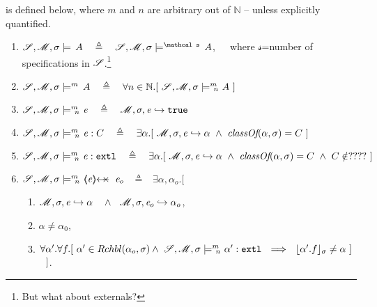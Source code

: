 \begin{definition} 
\label{def:chainmail-semantics}
\label{def:chainmail-protection-from}
\label{sect:semantics:assert:prtFrom}
 \label{def:chainmail-protection}
is defined below, where $m$ and $n$ are arbitrary out of $\mathbb N$ -- unless explicitly quantified.

\begin{enumerate}
\item
\label{sat}
$\sat \sigma  A \ \ \ \triangleq \ \ \   \satM  \sigma {\mathcal s}  A $,\ \ \  where ${\mathcal s}$=number of specifications in ${\mathcal{S}}$.\footnote{But what about externals?}
\item
\label{satM}
${{\mathcal{S}}, {\mathcal M}, \sigma \models^{m} \, A} \ \ \ \triangleq \ \ \  \forall n\in \mathbb{N}. [\ {\mathcal{S}}, {\mathcal M}, \sigma \models^{m} \!\!\!\!_{n} \ {A}\ ]$
\item
\label{cExpr}
$\satMN \sigma m n {{\re}}\ \ \ \triangleq \ \ \   \eval{\Mod}{\sigma}{{\re}}{\true}$  
\item
\label{cClass}
$\satMN \sigma m n {\re : C}\ \ \ \triangleq \ \ \   \exists \alpha.[\ \eval{\Mod}{\sigma}{{\re}}{\alpha}\   \wedge \ \class{\alpha} {\sigma}= C\ ]$  
\item
\label{cExternal}
$\satMN \sigma m n {\external \re}\ \ \ \triangleq \ \ \  \exists \alpha.[\ \eval{\Mod}{\sigma} {\re} {\alpha}\   \wedge \ \class{\alpha} {\sigma}= C  \ \wedge \ C \notin ???? \ ]$ 
 \item
 \label{cProtected}
$\satMN \sigma m n {\protectedFrom \re  {\re_o}}$ $\ \  \triangleq\ \ $ 
$\exists \alpha, \alpha_{o}. [$ 
  \begin{enumerate}
 \item
 $ \eval{\Mod}{\sigma}{{\re}}{\alpha}\ \ \ \wedge\ \ \eval{\Mod}{\sigma}{{\re_o}}{\alpha_o}$,
  \item
$\alpha\neq \alpha_0$,
 \item
$\forall \alpha'.\forall f.[\ \alpha' \in {\ensuremath{Rchbl(\alpha_o,\sigma)}} \wedge\   {\mathcal{S}}, {\mathcal M}, \sigma \models^{m} \!\!\!\!_{n} \ {\alpha':\mbox{\normalfont{\texttt{extl}}}} 
\ \ \Longrightarrow \ \  
  \lfloor \alpha'.f \rfloor_{\sigma} \neq \alpha     \ ] $  $  \strut \hspace{.25cm} ] $.
\end{enumerate}


\end{enumerate}
\end{definition}
